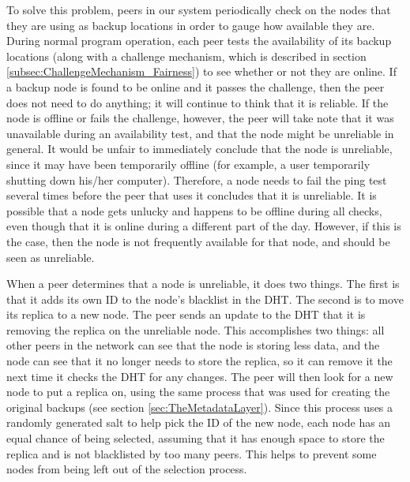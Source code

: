 \documentclass[12pt]{report}
\begin{document}
To solve this problem, peers in our system periodically check on the nodes that they are using as backup locations in order to gauge how available they are. During normal program operation, each peer tests the availability of its backup locations (along with a challenge mechanism, which is described in section \ref{subsec:ChallengeMechanism_Fairness}) to see whether or not they are online. If a backup node is found to be online and it passes the challenge, then the peer does not need to do anything; it will continue to think that it is reliable. If the node is offline or fails the challenge, however, the peer will take note that it was unavailable during an availability test, and that the node might be unreliable in general. It would be unfair to immediately conclude that the node is unreliable, since it may have been temporarily offline (for example, a user temporarily shutting down his/her computer). Therefore, a node needs to fail the ping test several times before the peer that uses it concludes that it is unreliable. It is possible that a node gets unlucky and happens to be offline during all checks, even though that it is online during a different part of the day. However, if this is the case, then the node is not frequently available for that node, and should be seen as unreliable.

When a peer determines that a node is unreliable, it does two things. The first is that it adds its own ID to the node's blacklist in the DHT. The second is to move its replica to a new node. The peer sends an update to the DHT that it is removing the replica on the unreliable node. This accomplishes two things: all other peers in the network can see that the node is storing less data, and the node can see that it no longer needs to store the replica, so it can remove it the next time it checks the DHT for any changes. The peer will then look for a new node to put a replica on, using the same process that was used for creating the original backups (see section \ref{sec:TheMetadataLayer}). Since this process uses a randomly generated salt to help pick the ID of the new node, each node has an equal chance of being selected, assuming that it has enough space to store the replica and is not blacklisted by too many peers. This helps to prevent some nodes from being left out of the selection process.
\end{document}
